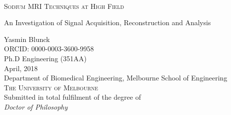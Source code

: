 \documentclass[11pt,a4paper]{book}
\begin{document}
	\renewcommand{\chapterbib}{}
	\renewcommand{\chapterfigures}{}
	\newcommand{\main}{.}

	\begin{titlepage}
    \centering
    
    \vspace*{3\baselineskip}
    
    \color{Gray} \hrulefill \\
    \centering \color{Black} \huge \scshape Sodium MRI Techniques at High Field
    
    \color{Gray} \LARGE An Investigation of Signal Acquisition, Reconstruction and Analysis \\ \hrulefill
    
    
		\vspace*{6\baselineskip}
		\color{black}
    {\Large Yasmin Blunck} \\
		\vspace*{0.75\baselineskip}
		\normalsize
    ORCID: 0000-0003-3600-9958 \\
		Ph.D Engineering (351AA) \\
		April, 2018 \\
		\vspace*{6\baselineskip}
		Department of Biomedical Engineering,
		Melbourne School of Engineering \\
		\vspace*{0.25\baselineskip}
		{\large \scshape The University of Melbourne} \\
		\vspace*{3\baselineskip}
		Submitted in total fulfilment of the degree of \\
		\vspace*{0.25\baselineskip}
		{\large \itshape Doctor of Philosophy} \\
  \end{titlepage}
\end{document}
